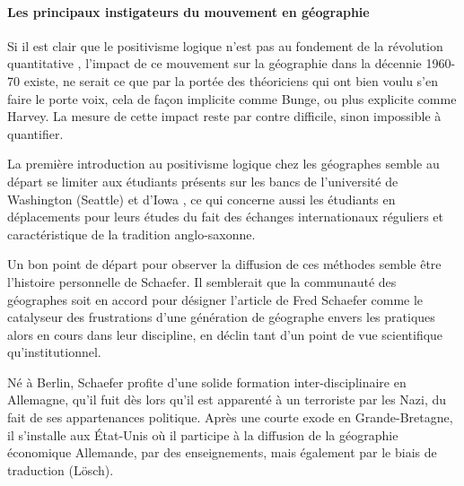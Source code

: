 

\paragraph{Les principaux instigateurs du mouvement en géographie}

Si il est clair que le positivisme logique n'est pas au fondement de la révolution quantitative \autocite{Claval2003}, l'impact de ce mouvement sur la géographie dans la décennie 1960-70 existe, ne serait ce que par la portée des théoriciens qui ont bien voulu s'en faire le porte voix, cela de façon implicite comme Bunge, ou plus  explicite comme Harvey. La mesure de cette impact reste par contre difficile, sinon impossible à quantifier.

La première introduction au positivisme logique chez les géographes semble au départ se limiter aux étudiants présents sur les bancs de l'université de Washington (Seattle) et d'Iowa \autocite[554]{Barnes2001a} \autocite[120-121]{Unwin1992}, ce qui concerne aussi les étudiants en déplacements pour leurs études du fait des échanges internationaux réguliers et caractéristique de la tradition anglo-saxonne.

Un bon point de départ pour observer la diffusion de ces méthodes semble être l'histoire personnelle de Schaefer. Il semblerait que la communauté des géographes soit en accord \autocite[15]{Louail2010} pour désigner l'article de Fred Schaefer \autocite{Schaefer1953} comme le catalyseur des frustrations d'une génération de géographe envers les pratiques alors en cours dans leur discipline, en déclin tant d'un point de vue scientifique qu’institutionnel.

Né à Berlin, Schaefer profite d'une solide formation inter-disciplinaire en Allemagne, qu'il fuit dès lors qu'il est apparenté à un terroriste par les Nazi, du fait de ses appartenances politique. Après une courte exode en Grande-Bretagne, il s'installe aux État-Unis où il participe à la diffusion de la géographie économique Allemande, par des enseignements, mais également par le biais de traduction (Lösch). \autocite{Bunge1979}


